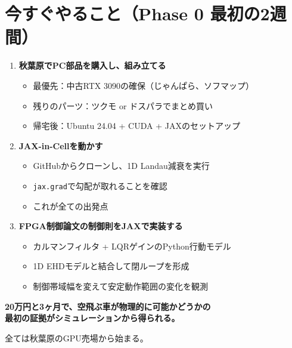 \documentclass[12pt,a4paper]{ltjsarticle}
\begin{document}
\newpage
\section{今すぐやること（Phase 0 最初の2週間）}

\begin{enumerate}[leftmargin=2em, itemsep=8pt]
  \item \textbf{秋葉原でPC部品を購入し、組み立てる}
    \begin{itemize}[leftmargin=2em]
      \item 最優先：中古RTX 3090の確保（じゃんぱら、ソフマップ）
      \item 残りのパーツ：ツクモ or ドスパラでまとめ買い
      \item 帰宅後：Ubuntu 24.04 + CUDA + JAXのセットアップ
    \end{itemize}

  \item \textbf{JAX-in-Cellを動かす}
    \begin{itemize}[leftmargin=2em]
      \item GitHubからクローンし、1D Landau減衰を実行
      \item \texttt{jax.grad}で勾配が取れることを確認
      \item これが全ての出発点
    \end{itemize}

  \item \textbf{FPGA制御論文の制御則をJAXで実装する}
    \begin{itemize}[leftmargin=2em]
      \item カルマンフィルタ + LQRゲインのPython行動モデル
      \item 1D EHDモデルと結合して閉ループを形成
      \item 制御帯域幅を変えて安定動作範囲の変化を観測
    \end{itemize}
\end{enumerate}

\begin{center}
\begin{tcolorbox}[colback=phase1!5, colframe=phase1!70, width=14cm]
\centering\sffamily\large
\textbf{20万円と3ヶ月で、空飛ぶ車が物理的に可能かどうかの\\最初の証拠がシミュレーションから得られる。}

\vspace{8pt}
\normalsize
全ては秋葉原のGPU売場から始まる。
\end{tcolorbox}
\end{center}
\end{document}

